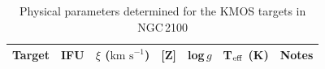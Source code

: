 \documentclass[useAMS,usenatbib]{mn2e}
\def\kms{$\mbox{km s}^{-1}$}
\def\pp{$\phantom{-}$}
\def\o{$\phantom{0}$}
\begin{document}
\begin{table}
\begin{center}
\caption{
Physical parameters determined for the KMOS targets in NGC\,2100
\label{tb:stellar-params}
         }
\scriptsize
\begin{threeparttable}
\begin{tabular}{lc ccccl}
 \hline
 \hline
  Target  & IFU & $\xi$ (\kms) & [Z] & log\,$g$ & T$_{\rm eff}$ (K) & Notes\tnote{a}\\
  \hline


\end{tabular}
\end{threeparttable}
\end{center}
\end{table}
\end{document}
